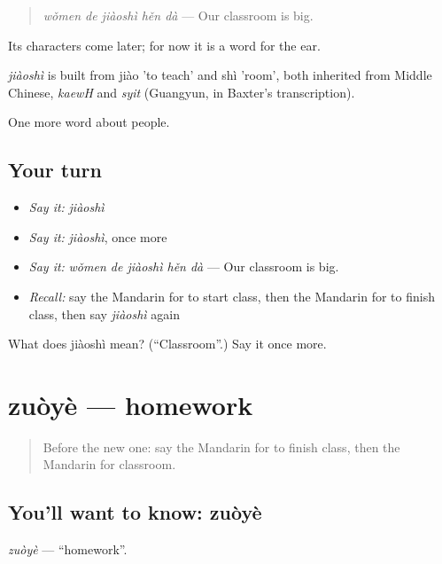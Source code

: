 \begin{quote}
\emph{wǒmen de jiàoshì hěn dà} — Our classroom is big.
\end{quote}

Its characters come later; for now it is a word for the ear.

\begin{cousinweb}
\emph{jiàoshì} is built from jiào 'to teach' and shì 'room', both inherited from Middle Chinese, \emph{kaewH} and \emph{syit} (Guangyun, in Baxter's transcription).
\end{cousinweb}

\begin{grammarlens}[title={What you've built}]
One more word about people.
\end{grammarlens}

\subsection*{Your turn}
\begin{itemize}
\raggedright
  \item \emph{Say it:} \emph{jiàoshì}
  \item \emph{Say it:} \emph{jiàoshì}, once more
  \item \emph{Say it:} \emph{wǒmen de jiàoshì hěn dà} — Our classroom is big.
  \item \emph{Recall:} say the Mandarin for to start class, then the Mandarin for to finish class, then say \emph{jiàoshì} again
\end{itemize}

\begin{tcolorbox}[breakable,colback=teal!4,colframe=teal!35!black,title={Before you move on}]
What does jiàoshì mean? (\textquotedblleft{}Classroom\textquotedblright{}.) Say it once more.
\end{tcolorbox}
\section[zuòyè]{zuòyè — homework}

\label{lesson:ZH-C79-zuoye}



\begin{quote}
Before the new one: say the Mandarin for to finish class, then the Mandarin for classroom.
\end{quote}

\subsection*{You'll want to know: zuòyè}
\emph{zuòyè} — \textquotedblleft{}homework\textquotedblright{}.

